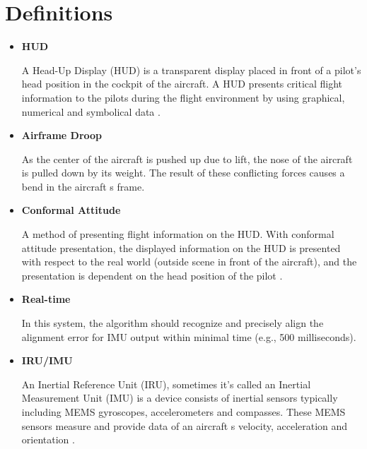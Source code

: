 \section{Definitions}
\begin{itemize}
	\item \textbf{HUD}
 	\begin{adjustwidth}{2.5em}{0pt}
 	A Head-Up Display (HUD) is a transparent display placed in front of a pilot’s head position in the cockpit of the aircraft. A HUD presents critical flight information to the pilots during the flight environment by using graphical, numerical and symbolical data \cite{hud}.
 	\\
 	\end{adjustwidth}

	\item \textbf{Airframe Droop}
 	\begin{adjustwidth}{2.5em}{0pt}
	As the center of the aircraft is pushed up due to lift, the nose of the aircraft is pulled down by its weight. The result of these conflicting forces causes a bend in the aircraft \textquotesingle s frame.
	\\
 	\end{adjustwidth}

	\item \textbf{Conformal Attitude}
 	\begin{adjustwidth}{2.5em}{0pt}
	A method of presenting flight information on the HUD. With conformal attitude presentation, the displayed information on the HUD is presented with respect to the real world (outside scene in front of the aircraft), and the presentation is dependent on the head position of the pilot \cite{conformal_atti}.
	\\
 	\end{adjustwidth}

 	\item \textbf{Real-time}
 	\begin{adjustwidth}{2.5em}{0pt}
	In this system, the algorithm should recognize and precisely align the alignment error for IMU output within minimal time (e.g., 500 milliseconds).\\
 	\end{adjustwidth}

 	\item \textbf{IRU/IMU}
 	\begin{adjustwidth}{2.5em}{0pt}
	An Inertial Reference Unit (IRU), sometimes it’s called an Inertial Measurement Unit (IMU) is a device consists of inertial sensors typically including MEMS gyroscopes, accelerometers and compasses. These MEMS sensors measure and provide data of an aircraft \textquotesingle s velocity, acceleration and orientation \cite{iru}.
	\\
 	\end{adjustwidth}


\end{itemize}
